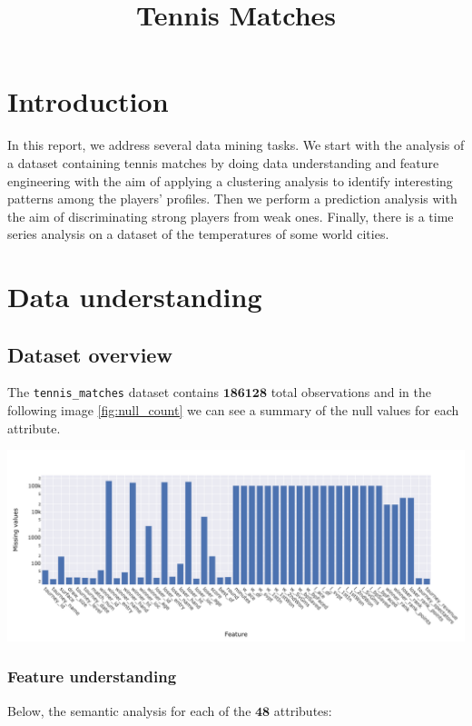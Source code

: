 \documentclass{article}
\title{Tennis Matches}
\begin{document}
    

\tableofcontents
\newpage

\section{Introduction}
In this report, we address several data mining tasks. We start with the analysis of a dataset containing tennis matches by doing data understanding and feature engineering with the aim of applying a clustering analysis to identify interesting patterns among the players' profiles. Then we perform a prediction analysis with the aim of discriminating strong players from weak ones. Finally, there is a time series analysis on a dataset of the temperatures of some world cities.

\section{Data understanding}

\subsection{Dataset overview}
The \texttt{tennis\_matches} dataset contains $\textbf{186128}$ total observations and in the following image \ref{fig:null_count} we can see a summary of the null values for each attribute.

\begin{center}
	\includegraphics[width=\textwidth]{plots/null_count.png}
	\label{fig:null_count}
	\label{fig1}
\end{center}

\subsubsection{Feature understanding}
Below, the semantic analysis for each of the $\textbf{48}$ attributes:
\end{document}
